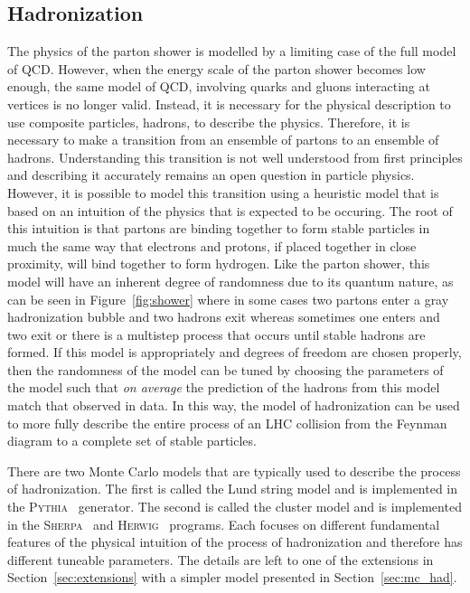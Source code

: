 \documentclass[UKenglish,texlive=2016]{\ATLASLATEXPATH atlasdoc}
\begin{document}
\subsection{Hadronization}
\label{sec:had}
The physics of the parton shower is modelled by a limiting case of the full model of QCD.  However, when the energy scale of the parton shower becomes low enough, the same model of QCD, involving quarks and gluons interacting at vertices is no longer valid.  Instead, it is necessary for the physical description to use composite particles, hadrons, to describe the physics.  Therefore, it is necessary to make a transition from an ensemble of partons to an ensemble of hadrons.  Understanding this transition is not well understood from first principles and describing it accurately remains an open question in particle physics.  However, it is possible to model this transition using a heuristic model that is based on an intuition of the physics that is expected to be occuring. The root of this intuition is that partons are binding together to form stable particles in much the same way that electrons and protons, if placed together in close proximity, will bind together to form hydrogen.  Like the parton shower, this model will have an inherent degree of randomness due to its quantum nature, as can be seen in Figure~\ref{fig:shower} where in some cases two partons enter a gray hadronization bubble and two hadrons exit whereas sometimes one enters and two exit or there is a multistep process that occurs until stable hadrons are formed.  If this model is appropriately and degrees of freedom are chosen properly, then the randomness of the model can be tuned by choosing the parameters of the model such that \textit{on average} the prediction of the hadrons from this model match that observed in data.  In this way, the model of hadronization can be used to more fully describe the entire process of an LHC collision from the Feynman diagram to a complete set of stable particles.

There are two Monte Carlo models that are typically used to describe the process of hadronization.  The first is called the Lund string model and is implemented in the \textsc{Pythia}~\cite{Sjostrand:2006za} generator.  The second is called the cluster model and is implemented in the \textsc{Sherpa}~\cite{Gleisberg:2008ta} and \textsc{Herwig}~\cite{Bahr:2008pv} programs.  Each focuses on different fundamental features of the physical intuition of the process of hadronization and therefore has different tuneable parameters.  The details are left to one of the extensions in Section~\ref{sec:extensions} with a simpler model presented in Section~\ref{sec:mc_had}.
\end{document}
